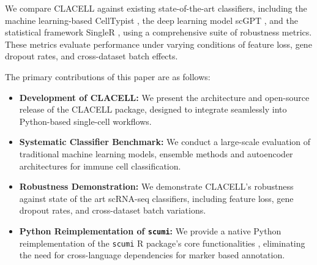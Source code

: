 \documentclass[11pt]{article}
\begin{document}
We compare CLACELL against existing state-of-the-art classifiers, including the machine learning-based CellTypist \cite{dominguez_conde_cross-tissue_2022}, the deep learning model scGPT \cite{cui_scgpt_2024}, and the statistical framework SingleR \cite{aran_reference-based_2019}, using a comprehensive suite of robustness metrics. These metrics evaluate performance under varying conditions of feature loss, gene dropout rates, and cross-dataset batch effects.

The primary contributions of this paper are as follows:
\begin{itemize}
    \item \textbf{Development of CLACELL:} We present the architecture and open-source release of the CLACELL package, designed to integrate seamlessly into Python-based single-cell workflows.
    \item \textbf{Systematic Classifier Benchmark:} We conduct a large-scale evaluation of traditional machine learning models, ensemble methods and autoencoder architectures for immune cell classification.
    \item \textbf{Robustness Demonstration:} We demonstrate CLACELL's robustness against state of the art scRNA-seq classifiers, including feature loss, gene dropout rates, and cross-dataset batch variations. %
    \item \textbf{Python Reimplementation of \texttt{scumi}:} We provide a native Python reimplementation of the \texttt{scumi} R package's core functionalities \cite{ding_systematic_2020}, eliminating the need for cross-language dependencies for marker based annotation.
\end{itemize}

\end{document}
